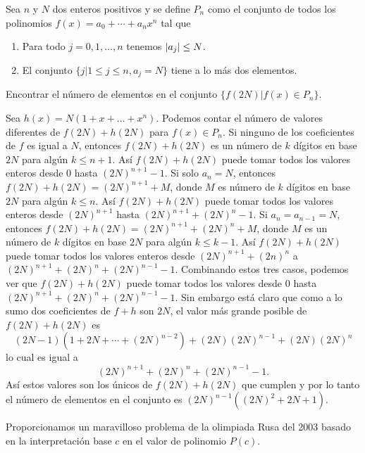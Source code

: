 \begin{example}
    Sea $n$ y $N$ dos enteros positivos y se define $P_n$ como el conjunto de todos los polinomios $f(x) = a_0 + \cdots + a_n x^n$ tal que
    \begin{enumerate}
        \item Para todo $j = 0, 1, \ldots, n$ tenemos $\lvert a_j\rvert \leq N$.
        \item El conjunto $\{j | 1 \leq j \leq n, a_j = N\}$ tiene a lo más dos elementos.
    \end{enumerate}
    Encontrar el número de elementos en el conjunto $\{f(2N) | f(x) \in P_n \}$.
\end{example}
\begin{solution}
    Sea $h(x) = N (1 + x + \ldots + x^n)$.
    Podemos contar el número de valores diferentes de $f(2N) + h(2N)$ para $f(x) \in P_n$.
    Si ninguno de los coeficientes de $f$ es igual a $N$, entonces $f(2N) + h(2N)$ es un número de $k$ dígitos en base $2N$ para algún $k \leq n + 1$.
    Así $f(2N) + h(2N)$ puede tomar todos los valores enteros desde 0 hasta $(2N)^{n + 1} - 1$.
    Si solo $a_n = N$, entonces $f(2N) + h(2N) = (2N)^{n + 1} + M$, donde $M$ es número de $k$ dígitos en base $2N$ para algún $k \leq n$.
    Así $f(2N) + h(2N)$ puede tomar todos los valores enteros desde $(2N)^{n + 1}$ hasta $(2N)^{n + 1} + (2N)^n - 1$.
    Si $a_n = a_{n - 1} = N$, entonces $f(2N) + h(2N) = (2N)^{n + 1} + (2N)^n + M$, donde $M$ es un número de $k$ dígitos en base $2N$ para algún $k \leq k - 1$.
    Así $f(2N) + h(2N)$ puede tomar todos los valores enteros desde $(2N)^{n + 1} + (2n)^n$ a $(2N)^{n + 1} + (2N)^n + (2N)^{n - 1} - 1$.
    Combinando estos tres casos, podemos ver que $f(2N) + h(2N)$ puede tomar todos los valores desde 0 hasta $(2N)^{n + 1} + (2N)^n + (2N)^{n - 1} - 1$.
    Sin embargo está claro que como a lo sumo dos coeficientes de $f + h$ son $2N$, el valor más grande posible de $f(2N) + h(2N)$ es
    \[
        (2N - 1)(1 + 2N + \cdots + (2N)^{n - 2}) + (2N)(2N)^{n - 1} + (2N)(2N)^n
    \]
    lo cual es igual a
    \[
        (2N)^{n + 1} + (2N)^n + (2N)^{n - 1} - 1.
    \]
    Así estos valores son los únicos de $f(2N) + h(2N)$ que cumplen y por lo tanto el número de elementos en el conjunto es $(2N)^{n - 1} ( (2N)^2 + 2N + 1)$.
\end{solution}

Proporcionamos un maravilloso problema de la olimpiada Rusa del 2003 basado en la interpretación base $c$ en el valor de polinomio $P(c)$.

